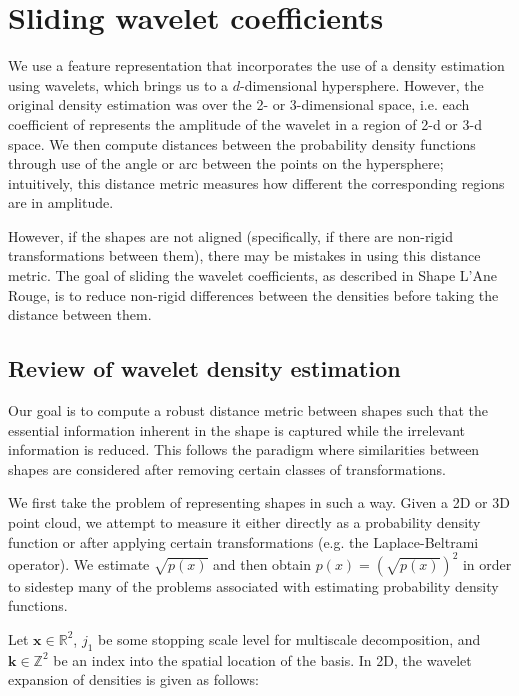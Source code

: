 \documentclass[../tech_report_1.tex]{subfiles}
\begin{document}
\section{Sliding wavelet coefficients}

We use a feature representation that incorporates the use of a density estimation using wavelets, which brings us to a $d$-dimensional hypersphere. However, the original density estimation was over the 2- or 3-dimensional space, i.e. each coefficient of represents the amplitude of the wavelet in a region of 2-d or 3-d space. We then compute distances between the probability density functions through use of the angle or arc between the points on the hypersphere; intuitively, this distance metric measures how different the corresponding regions are in amplitude.

However, if the shapes are not aligned (specifically, if there are non-rigid transformations between them), there may be mistakes in using this distance metric. The goal of sliding the wavelet coefficients, as described in Shape L'Ane Rouge\cite{peter2008shape}, is to reduce non-rigid differences between the densities before taking the distance between them.

\subsection{Review of wavelet density estimation}

Our goal is to compute a robust distance metric between shapes such that the essential information inherent in the shape is captured while the irrelevant information is reduced. This follows the paradigm where similarities between shapes are considered after removing certain classes of transformations\cite{peter2008shape,klein1893comparative}.

We first take the problem of representing shapes in such a way. Given a 2D or 3D point cloud, we attempt to measure it either directly as a probability density function or after applying certain transformations (e.g. the Laplace-Beltrami operator). We estimate $\sqrt{p(x)}$ and then obtain $p(x) = (\sqrt{p(x)})^2$ in order to sidestep many of the problems associated with estimating probability density functions. 

Let $\bm{x} \in \mathbb{R}^2$, $j_1$ be some stopping scale level for multiscale decomposition, and $\bm{k} \in \mathbb{Z}^2$ be an index into the spatial location of the basis. In 2D, the wavelet expansion of densities is given as follows: 
\end{document}
